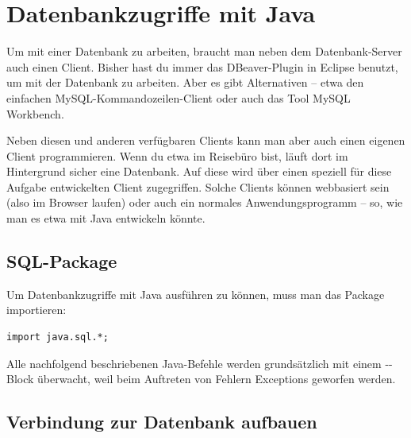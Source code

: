 \chapter{Datenbankzugriffe mit Java \tagLK}
\renewcommand{\chaptertitle}{Datenbankzugriffe mit Java}

\lehead[]{\normalfont\sffamily\hspace*{-2.00cm}\textcolor{white}{\colorbox{lightblue}{\makebox[1.60cm][r]{\thechapter}}}\hspace{0.17cm}\textcolor{lightblue}{\chaptertitle}}
\rohead[]{\textcolor{lightblue}{\chaptertitle}\normalfont\sffamily\hspace*{0.17cm}\textcolor{white}{\colorbox{lightblue}{\makebox[1.60cm][l]{\thechapter}}}\hspace{-2.00cm}}
\rehead[]{\textcolor{lightblue}{AvHG, Inf, My}}
\lohead[]{\textcolor{lightblue}{AvHG, Inf, My}}

\lstset{style=myJava}

Um mit einer Datenbank zu arbeiten, braucht man neben dem Datenbank-Server auch
einen Client. Bisher hast du immer das DBeaver-Plugin in Eclipse benutzt, um
mit der Datenbank zu arbeiten. Aber es gibt Alternativen -- etwa den einfachen
MySQL-Kommandozeilen-Client oder auch das Tool MySQL Workbench.

Neben diesen und anderen verfügbaren Clients kann man aber auch einen eigenen
Client programmieren. Wenn du etwa im Reisebüro bist, läuft dort im Hintergrund
sicher eine Datenbank. Auf diese wird über einen speziell für diese Aufgabe
entwickelten Client zugegriffen. Solche Clients können webbasiert sein (also
im Browser laufen) oder auch ein normales Anwendungsprogramm -- so, wie man es
etwa mit Java entwickeln könnte.


\section{SQL-Package}

Um Datenbankzugriffe mit Java ausführen zu können, muss man das Package
 importieren:

\begin{lstlisting}
import java.sql.*;
\end{lstlisting}

Alle nachfolgend beschriebenen Java-Befehle werden grundsätzlich mit einem
--Block überwacht, weil beim Auftreten von Fehlern
Exceptions geworfen werden.


\section{Verbindung zur Datenbank aufbauen}


